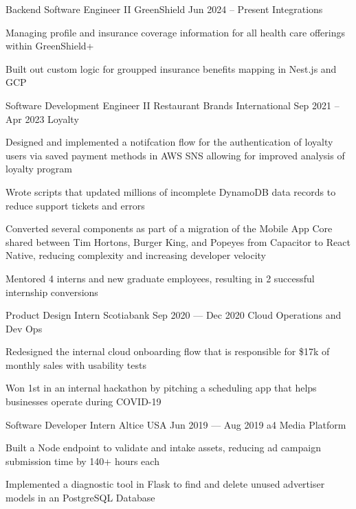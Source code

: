 \begin{cventries}
  \cventry
      {Backend Software Engineer II}
      {GreenShield}
      {}
      {Jun 2024 -- Present}
      {Integrations}
      {
        \begin{cvitems}
          \item {Managing profile and insurance coverage information for all health care offerings within GreenShield+}
          \item {Built out custom logic for groupped insurance benefits mapping in Nest.js and GCP}
        \end{cvitems}
      }
  \cventry
      {Software Development Engineer II}
      {Restaurant Brands International}
      {}
      {Sep 2021 -- Apr 2023}
      {Loyalty}
      {
        \begin{cvitems}
          \item {Designed and implemented a notifcation flow for the authentication of loyalty users via saved payment methods in AWS SNS allowing for improved analysis of loyalty program}
          \item {Wrote scripts that updated millions of incomplete DynamoDB data records to reduce support tickets and errors}
          \item {Converted several components as part of a migration of the Mobile App Core shared between Tim Hortons, Burger King, and Popeyes from Capacitor to React Native, reducing complexity and increasing developer velocity}
          \item {Mentored 4 interns and new graduate employees, resulting in 2 successful internship conversions}
        \end{cvitems}
      }
  \cventry
    {Product Design Intern}
    {Scotiabank}
    {}
    {Sep 2020 --- Dec 2020}
    {Cloud Operations and Dev Ops}
    {
      \begin{cvitems}
        \item {Redesigned the internal cloud onboarding flow that is responsible for \$17k of monthly sales with usability tests}
        \item {Won 1st in an internal hackathon by pitching a scheduling app that helps businesses operate during COVID-19}
      \end{cvitems}
    }

  \cventry
    {Software Developer Intern}
    {Altice USA}
    {}
    {Jun 2019 --- Aug 2019}
    {a4 Media Platform}
    {
    \begin{cvitems}
      \item {Built a Node endpoint to validate and intake assets, reducing ad campaign submission time by 140+ hours each}
      \item {Implemented a diagnostic tool in Flask to find and delete unused advertiser models in an PostgreSQL Database}
    \end{cvitems}
    }


\end{cventries}

